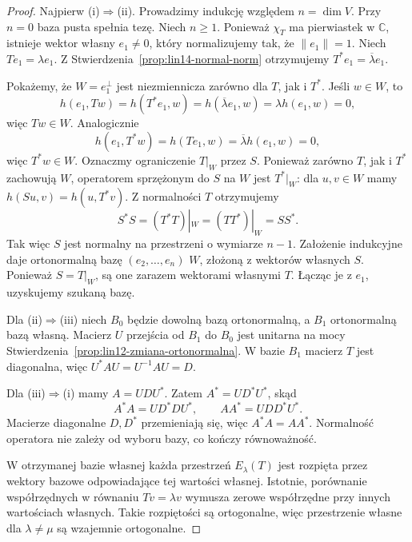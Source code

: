 \begin{proof}
Najpierw (i)\(\Rightarrow\)(ii).
Prowadzimy indukcję względem
\(n=\dim V\). Przy \(n=0\)
baza pusta spełnia tezę.
Niech \(n\ge1\).
Ponieważ \(\chi_T\) ma pierwiastek
w \(\mathbb C\),
istnieje wektor własny
\(e_1\ne0\), który normalizujemy
tak, że \(\|e_1\|=1\).
Niech \(Te_1=\lambda e_1\).
Z
Stwierdzenia~\ref{prop:lin14-normal-norm}
otrzymujemy
\(T^*e_1=\overline\lambda e_1\).

Pokażemy, że \(W=e_1^\perp\)
jest niezmiennicza zarówno
dla \(T\), jak i \(T^*\).
Jeśli \(w\in W\), to
\[
 h(e_1,Tw)=h(T^*e_1,w)
          =h(\overline\lambda e_1,w)
          =\lambda h(e_1,w)=0,
\]
więc \(Tw\in W\).
Analogicznie
\[
 h(e_1,T^*w)=h(Te_1,w)
            =\overline\lambda h(e_1,w)=0,
\]
więc \(T^*w\in W\).
Oznaczmy ograniczenie \(T|_W\)
przez \(S\). Ponieważ zarówno
\(T\), jak i \(T^*\)
zachowują \(W\), operatorem
sprzężonym do \(S\) na \(W\)
jest \(T^*|_W\):
dla \(u,v\in W\) mamy
\(h(Su,v)=h(u,T^*v)\).
Z normalności \(T\) otrzymujemy
\[
 S^*S=(T^*T)|_W=(TT^*)|_W=SS^*.
\]
Tak więc \(S\) jest normalny
na przestrzeni o wymiarze \(n-1\).
Założenie indukcyjne daje
ortonormalną bazę
\((e_2,\ldots,e_n)\) \(W\),
złożoną z wektorów własnych \(S\).
Ponieważ \(S=T|_W\),
są one zarazem wektorami własnymi \(T\).
Łącząc je z \(e_1\),
uzyskujemy szukaną bazę.

Dla (ii)\(\Rightarrow\)(iii)
niech \(B_0\) będzie dowolną bazą
ortonormalną, a \(B_1\)
ortonormalną bazą własną.
Macierz \(U\) przejścia od \(B_1\)
do \(B_0\) jest unitarna
na mocy
Stwierdzenia~\ref{prop:lin12-zmiana-ortonormalna}.
W bazie \(B_1\) macierz \(T\)
jest diagonalna, więc
\(U^*AU=U^{-1}AU=D\).

Dla (iii)\(\Rightarrow\)(i)
mamy \(A=UDU^*\).
Zatem \(A^*=UD^*U^*\), skąd
\[
 A^*A=UD^*DU^*,\qquad
 AA^*=UDD^*U^*.
\]
Macierze diagonalne \(D,D^*\)
przemieniają się, więc
\(A^*A=AA^*\).
Normalność operatora
nie zależy od wyboru bazy,
co kończy równoważność.

W otrzymanej bazie własnej
każda przestrzeń \(E_\lambda(T)\)
jest rozpięta przez wektory
bazowe odpowiadające tej wartości
własnej. Istotnie, porównanie
współrzędnych w równaniu
\(Tv=\lambda v\) wymusza
zerowe współrzędne przy
innych wartościach własnych.
Takie rozpiętości są ortogonalne,
więc przestrzenie własne
dla \(\lambda\ne\mu\)
są wzajemnie ortogonalne.
\end{proof}


